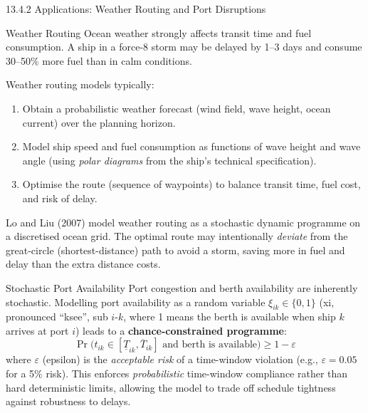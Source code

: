 \documentclass[aspectratio=169,10pt]{beamer}
\begin{document}
\begin{frame}[allowframebreaks]{13.4.2 Applications: Weather Routing and Port Disruptions}
  \begin{block}{Weather Routing}
    Ocean weather strongly affects transit time and fuel consumption.
    A ship in a force-8 storm may be delayed by 1--3 days and consume
    30--50\% more fuel than in calm conditions.

    Weather routing models typically:
    \begin{enumerate}
      \item Obtain a probabilistic weather forecast (wind field, wave height,
            ocean current) over the planning horizon.
      \item Model ship speed and fuel consumption as functions of wave height
            and wave angle (using \emph{polar diagrams} from the ship's
            technical specification).
      \item Optimise the route (sequence of waypoints) to balance transit
            time, fuel cost, and risk of delay.
    \end{enumerate}
    Lo and Liu (2007) model weather routing as a stochastic dynamic
    programme on a discretised ocean grid.  The optimal route may
    intentionally \emph{deviate} from the great-circle (shortest-distance)
    path to avoid a storm, saving more in fuel and delay than the extra
    distance costs.
  \end{block}

  \begin{block}{Stochastic Port Availability}
    Port congestion and berth availability are inherently stochastic.
    Modelling port availability as a random variable
    $\xi_{ik} \in \{0, 1\}$ (xi, pronounced ``ksee'', sub $i$-$k$,
    where 1 means the berth is available when ship $k$ arrives at port $i$)
    leads to a \textbf{chance-constrained programme}:
    \begin{equation}
      \Pr\!\bigl(t_{ik} \in [\underline{T}_{ik}, \overline{T}_{ik}]
      \text{ and berth is available}\bigr) \geq 1 - \varepsilon
    \end{equation}
    where $\varepsilon$ (epsilon) is the \emph{acceptable risk} of a
    time-window violation (e.g., $\varepsilon = 0.05$ for a 5\% risk).
    This enforces \emph{probabilistic} time-window compliance rather
    than hard deterministic limits, allowing the model to trade off
    schedule tightness against robustness to delays.
  \end{block}


\end{frame}
\end{document}
